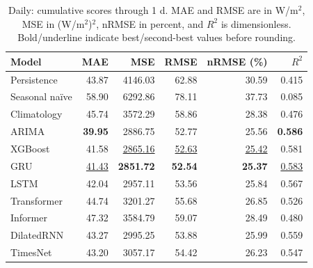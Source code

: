 \begin{table}[!htbp]
\centering
\small
\setlength{\tabcolsep}{6pt}
\caption{Daily: cumulative scores through 1 d. MAE and RMSE are in W/m$^2$, MSE in (W/m$^2$)$^2$, nRMSE in percent, and $R^2$ is dimensionless. Bold/underline indicate best/second-best values before rounding.}
\label{tab:baseline_daily_30_1}
\begin{tabular}{@{}lrrrrr@{}}
\toprule
Model & MAE & MSE & RMSE & nRMSE (\%) & $R^2$ \\
\midrule
Persistence & 43.87 & 4146.03 & 62.88 & 30.59 & 0.415 \\
Seasonal na\"ive & 58.90 & 6292.86 & 78.11 & 37.73 & 0.085 \\
Climatology & 45.74 & 3572.29 & 58.86 & 28.38 & 0.476 \\
ARIMA & \textbf{39.95} & 2886.75 & 52.77 & 25.56 & \textbf{0.586} \\
XGBoost & 41.58 & \underline{2865.16} & \underline{52.63} & \underline{25.42} & 0.581 \\
GRU & \underline{41.43} & \textbf{2851.72} & \textbf{52.54} & \textbf{25.37} & \underline{0.583} \\
LSTM & 42.04 & 2957.11 & 53.56 & 25.84 & 0.567 \\
Transformer & 44.74 & 3201.27 & 55.68 & 26.85 & 0.526 \\
Informer & 47.32 & 3584.79 & 59.07 & 28.49 & 0.480 \\
DilatedRNN & 43.27 & 2995.25 & 53.88 & 25.99 & 0.559 \\
TimesNet & 43.20 & 3057.17 & 54.42 & 26.23 & 0.547 \\
\bottomrule
\end{tabular}
\end{table}

